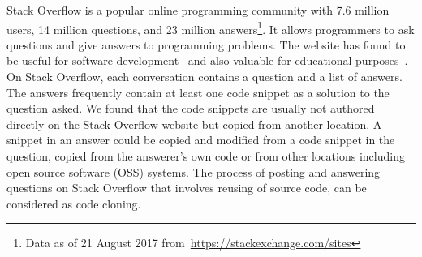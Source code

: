 \documentclass[10pt,journal,compsoc]{IEEEtran}
\begin{document}
\maketitle


\IEEEdisplaynontitleabstractindextext



%
\IEEEpeerreviewmaketitle


Stack Overflow is a popular online programming community with 7.6
million users, 14 million questions, and 23 million answers\footnote{Data as of 21
	August 2017 from~\url{https://stackexchange.com/sites}}. It allows programmers to ask questions and give answers
to programming problems. The website has found to be useful for
software
development~\cite{Ponzanelli2013,Ponzanelli2014,Keivanloo2014,Park2014,
	Stolee2014,Subramanian2013,Diamantopoulos2015,Treude2016} and also
valuable for educational purposes~\cite{Nasehi2012}. On Stack
Overflow, each conversation contains a question and a list of
answers. The answers frequently contain at least one code snippet as
a solution to the question asked. We found that the code snippets are
usually not authored directly on the Stack Overflow website but copied
from another location. A snippet in an answer could be copied and modified
from a code snippet in the question, copied from the answerer's own
code or from other locations including open source software (OSS)
systems. The process of posting and answering questions on Stack
Overflow that involves reusing of source code, can be considered as
code cloning.
\end{document}
